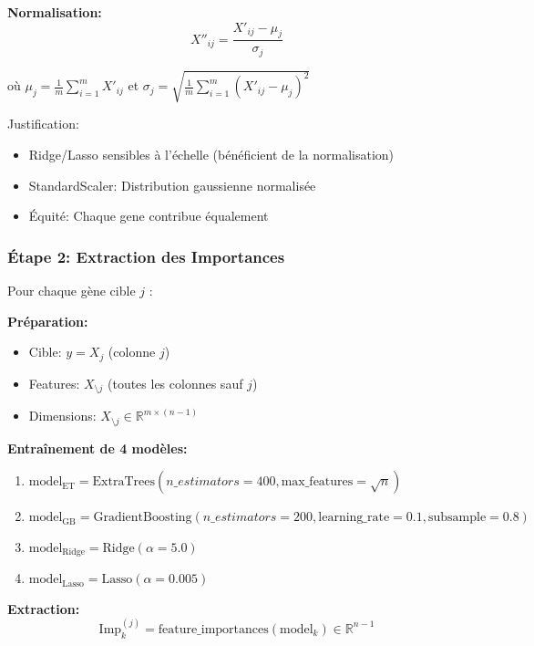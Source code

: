 \documentclass[12pt,a4paper,french]{article}
\begin{document}
\textbf{Normalisation:}
\begin{equation}
X''_{ij} = \frac{X'_{ij} - \mu_j}{\sigma_j}
\end{equation}

où $\mu_j = \frac{1}{m} \sum_{i=1}^m X'_{ij}$ et $\sigma_j = \sqrt{\frac{1}{m} \sum_{i=1}^m (X'_{ij} - \mu_j)^2}$

Justification:
\begin{itemize}
    \item Ridge/Lasso sensibles à l'échelle (bénéficient de la normalisation)
    \item StandardScaler: Distribution gaussienne normalisée
    \item Équité: Chaque gene contribue équalement
\end{itemize}

\subsubsection{Étape 2: Extraction des Importances}

Pour chaque gène cible $j$ :

\textbf{Préparation:}
\begin{itemize}
    \item Cible: $y = X_j$ (colonne $j$)
    \item Features: $X_{\setminus j}$ (toutes les colonnes sauf $j$)
    \item Dimensions: $X_{\setminus j} \in \mathbb{R}^{m \times (n-1)}$
\end{itemize}

\textbf{Entraînement de 4 modèles:}
\begin{enumerate}
    \item $\text{model}_{\text{ET}} = \text{ExtraTrees}(n\_estimators=400, \text{max\_features}=\sqrt{n})$
    \item $\text{model}_{\text{GB}} = \text{GradientBoosting}(n\_estimators=200, \text{learning\_rate}=0.1, \text{subsample}=0.8)$
    \item $\text{model}_{\text{Ridge}} = \text{Ridge}(\alpha=5.0)$
    \item $\text{model}_{\text{Lasso}} = \text{Lasso}(\alpha=0.005)$
\end{enumerate}

\textbf{Extraction:}
\begin{equation}
\text{Imp}_k^{(j)} = \text{feature\_importances}(\text{model}_k) \in \mathbb{R}^{n-1}
\end{equation}
\end{document}
